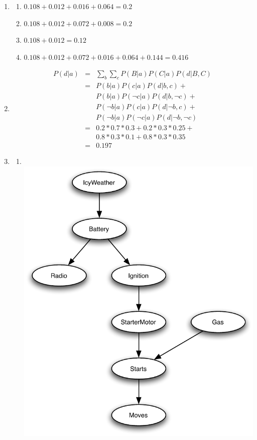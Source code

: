 \documentclass[10pt]{article}
\begin{document}
\begin{enumerate}
\item %
  \begin{enumerate}
  \item %
    $0.108 + 0.012 + 0.016 + 0.064 = 0.2$
  \item %
    $0.108 + 0.012 + 0.072 + 0.008 = 0.2$
  \item %
    $0.108 + 0.012 = 0.12$
  \item %
    $0.108 + 0.012 + 0.072 + 0.016 + 0.064 + 0.144 = 0.416$
    
  \end{enumerate}

\item %
  \begin{eqnarray*}
  P(d | a) & = & \sum_b \sum_c P(B | a)  P(C | a)  P(d | B, C) \\
           & = & P(b | a)  P(c | a)  P(d | b,c) + \\
           &   & P(b | a)  P(\neg c | a) P(d | b, \neg c) + \\
           &   & P(\neg b | a) P(c | a) P(d | \neg b, c) + \\
           &   & P(\neg b | a) P(\neg c | a) P(d | \neg b, \neg c) \\
           & = & 0.2 * 0.7 * 0.3 + 0.2 * 0.3 * 0.25 + \\
           &   & 0.8 * 0.3 * 0.1 + 0.8 * 0.3 * 0.35 \\
           & = & 0.197
  \end{eqnarray*}
\item %
  \begin{enumerate}
  \item %
    \ \\
    \includegraphics{5a_car.pdf}


\end{enumerate}
\end{enumerate}
\end{document}
